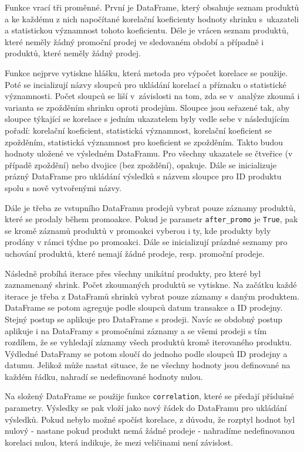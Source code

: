 Funkce vrací tři proměnné. První je DataFrame, který obsahuje seznam produktů a ke každému z nich napočítané korelační koeficienty hodnoty shrinku s~ukazateli a statistickou významnost tohoto koeficientu. Déle je vrácen seznam produktů, které neměly žádný promoční prodej ve sledovaném období a případně i produktů, které neměly žádný prodej.

Funkce nejprve vytiskne hlášku, která metoda pro výpočet korelace se použije. Poté se incializují názvy sloupců pro ukládání korelací a příznaku o statistické významnosti. Počet sloupců se liší v~závislosti na tom, zda se v~analýze zkoumá i varianta se zpožděním shrinku oproti prodejům. Sloupce jsou seřazené tak, aby sloupce týkající se korelace s jedním ukazatelem byly vedle sebe v následujícím pořadí: korelační koeficient, statistická významnost, korelační koeficient se zpožděním, statistická významnost pro koeficient se zpožděním. Takto budou hodnoty uložené ve výsledném DataFramu. Pro všechny ukazatele se čtveřice (v případě zpoždění) nebo dvojice (bez zpoždění), opakuje. Dále se inicializuje prázný DataFrame pro ukládání výsledků s názvem sloupce pro ID produktu spolu s nově vytvořenými názvy. 

Dále je třeba ze vstupního DataFramu prodejů vybrat pouze záznamy produktů, které se prodaly během promoakce. Pokud je parametr \texttt{after\_promo} je \texttt{True}, pak se kromě záznamů produktů v promoakci vyberou i ty, kde produkty byly prodány v rámci týdne po promoakci. Dále se inicializují prázdné seznamy pro uchování produktů, které nemají žádné prodeje, resp. promoční prodeje.

Následně probíhá iterace přes všechny unikátní produkty, pro které byl zaznamenaný shrink. Počet zkoumaných produktů se vytiskne. Na začátku každé iterace je třeba z DataFramů shrinků vybrat pouze záznamy s daným produktem. DataFrame se potom agreguje podle sloupců datum transakce a ID prodejny. Stejný postup se aplikuje pro DataFrame s prodeji. Navíc se obdobný postup aplikuje i na DataFramy s promočními záznamy a se všemi prodeji s tím rozdílem, že se vyhledají záznamy všech produktů kromě iterovaného produktu. Výdledné DataFramy se potom sloučí do jednoho podle sloupců ID prodejny a datumu. Jelikož může nastat situace, že ne všechny hodnoty jsou definované na každém řádku, nahradí se nedefinované hodnoty nulou.

Na složený DataFrame se použije funkce \texttt{correlation}, které se předají příslušné parametry. Výsledky se pak vloží jako nový řádek do DataFramu pro ukládání výsledků. Pokud nebylo možné spočíst korelace, z důvodu, že rozptyl hodnot byl nulový - nastane pokud produkt nemá žádné prodeje -  nahradíme nedefinovanou korelaci nulou, která indikuje, že mezi veličinami není závislost.

